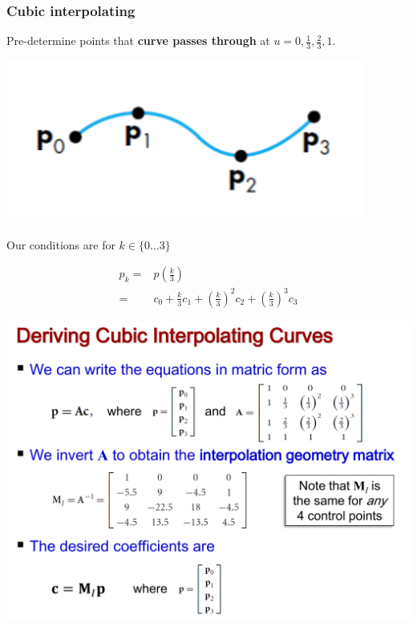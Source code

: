 \documentclass{beamer}
\begin{document}
\begin{frame}
    \frametitle{Cubic interpolating}

    Pre-determine points that \textbf{curve passes through} at $u = 0, \frac{1}{3}, \frac{2}{3}, 1$.

    \begin{center}
        \includegraphics[scale=0.7]{cubic-interpolating.png}
    \end{center}

    Our conditions are for $k \in \{0 \dots 3\}$

    \begin{eqnarray*}
        p_k =& p(\frac{k}{3})\\
        =& c_0 + \frac{k}{3}c_1 + \left(\frac{k}{3}\right)^2c_2 + \left(\frac{k}{3}\right)^3 c_3
    \end{eqnarray*}

\end{frame}

\begin{frame}
    \centering
    \includegraphics[scale=0.4]{derive-cubic-interpolating.png}
\end{frame}
\end{document}
